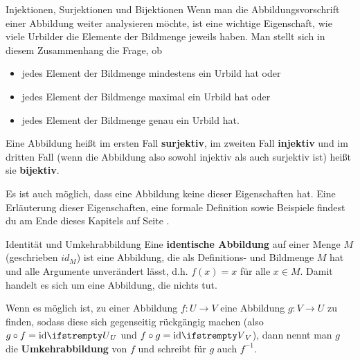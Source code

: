 \documentclass[../../main.tex]{subfiles}
\begin{document}
\begin{advanced}{Injektionen, Surjektionen und Bijektionen}
    Wenn man die Abbildungsvorschrift einer Abbildung weiter analysieren möchte, ist eine wichtige Eigenschaft, wie viele Urbilder die Elemente der Bildmenge jeweils haben. Man stellt sich in diesem Zusammenhang die Frage, ob
    \begin{itemize}[noitemsep]
        \item jedes Element der Bildmenge mindestens ein Urbild hat oder
        \item jedes Element der Bildmenge maximal ein Urbild hat oder
        \item jedes Element der Bildmenge genau ein Urbild hat.
    \end{itemize}
    
    Eine Abbildung heißt im ersten Fall \textbf{surjektiv}, im zweiten Fall \textbf{injektiv} und im dritten Fall (wenn die Abbildung also sowohl injektiv als auch surjektiv ist) heißt sie \textbf{bijektiv}.
    
    Es ist auch möglich, dass eine Abbildung keine dieser Eigenschaften hat.
    Eine Erläuterung dieser Eigenschaften, eine formale Definition sowie Beispiele findest du am Ende dieses Kapitels auf Seite \pageref{advanced:bijektion}.
\end{advanced}

\begin{nutshell}{Identität und Umkehrabbildung}
    \sloppy
    Eine \textbf{identische Abbildung} auf einer Menge $M$ (geschrieben $id_M$) ist eine Abbildung, die als Definitions- und Bildmenge $M$ hat und alle Argumente unverändert lässt, d.h. $f(x)=x$ für alle $x\in M$. Damit handelt es sich um eine Abbildung, die nichts tut.
    
    Wenn es möglich ist, zu einer Abbildung $f\colon U\rightarrow V$ eine Abbildung $g\colon V\rightarrow U$ zu finden, sodass diese sich gegenseitig rückgängig machen (also $g\circ f=\ident[U]$ und $f\circ g=\ident[V]$), dann nennt man $g$ die \textbf{Umkehrabbildung} von $f$ und schreibt für $g$ auch $f^{-1}$.
\end{nutshell}
\fussy
\end{document}
